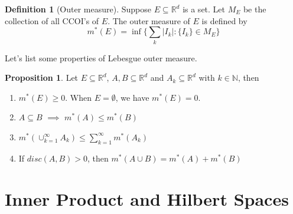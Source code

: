 \documentclass{article}
\theoremstyle{definition}
\newtheorem{definition}{Definition}[section]
\newtheorem{proposition}{Proposition}[section]
\begin{document}
\begin{definition}[Outer measure]
Suppose $E \subseteq \mathbb{R}^d$ is a set. Let $M_E$ be the collection of all CCOI's of $E$. The outer measure of $E$ is defined by
\begin{equation}
m^{*}(E)=\inf\{\sum_k |I_k|:\{I_k\} \in M_E\}
\end{equation}
\end{definition}

Let's list some properties of Lebesgue outer measure.
\begin{proposition}
Let $E\subseteq \mathbb{R}^d$, $A,B \subseteq \mathbb{R}^d$ and $A_k \subseteq \mathbb{R}^d$ with $k\in \mathbb{N}$, then
\begin{enumerate}
	\item $m^{*}(E) \geq 0$. When  $E= \emptyset$, we have $m^{*}(E)=0$.
	\item $A\subseteq B$ $\implies$ $m^{*}(A) \leq m^{*}(B)$
	\item $m^{*}(\cup_{k=1}^{\infty}A_k) \leq \sum_{k=1}^{\infty}m^{*}(A_k)$
	\item If $disc(A,B)>0$, then $m^{*}(A\cup B)=m^{*}(A)+m^{*}(B)$

\end{enumerate}

\end{proposition}







\section{Inner Product and Hilbert Spaces}
\end{document}
